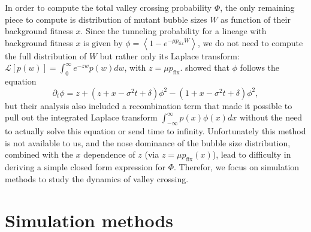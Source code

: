 \documentclass[rmp]{revtex4}
\newcommand{\pfix}{p_{\mathrm{fix}}}
\begin{document}
\begin{spacing}{1.5}
In order to compute the total valley crossing probability $\Phi$, the only remaining piece to compute is distribution of mutant bubble sizes $W$ as function of their background fitness $x$.
Since the tunneling probability for a lineage with background fitness $x$ is given by $\phi = \left< 1 - e^{-\mu p_{\mathrm fix} W} \right>$, we do not need to compute the full distribution of $W$ but rather only its Laplace transform: $\mathcal{L}\left[ p(w) \right] = \int_0^\infty e^{-zw} p(w) dw$, with $z = \mu \pfix$.
\citet{neher_shraiman_2011} showed that $\phi$ follows the equation
\begin{equation}
\partial_t \phi = z + (z + x - \sigma^2 t + \delta)\phi^2 - (1 + x - \sigma^2 t + \delta)\phi^2,
\end{equation}
but their analysis also included a recombination term that made it possible to pull out the integrated Laplace transform $\int_{-\infty}^\infty p(x) \phi(x) dx$ without the need to actually solve this equation or send time to infinity.
Unfortunately this method is not available to us, and the nose dominance of the bubble size distribution, combined with the $x$ dependence of $z$ (via $z = \mu \pfix(x)$), lead to difficulty in deriving a simple closed form expression for $\Phi$.
Therefor, we focus on simulation methods to study the dynamics of valley crossing.

\section*{Simulation methods}


\end{spacing}
\end{document}
